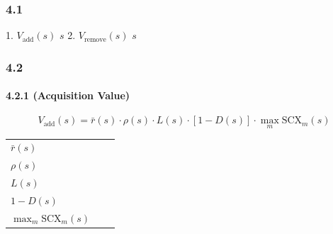 \documentclass[
  12pt,
]{article}
\begin{document}
\subsubsection{4.1 }\label{ux95eeux9898ux8bbeux5b9a-3}

 1. \textbf{}
\(V_{\text{add}}(s)\) \(s\)
 2. \textbf{}
\(V_{\text{remove}}(s)\) \(s\)




\subsubsection{4.2 }\label{ux6570ux5b66ux6a21ux578b-3}

\paragraph{4.2.1  (Acquisition
Value)}\label{ux91c7ux96c6ux4ef7ux503c-acquisition-value}

\textbf{}

\[
V_{\text{add}}(s) = \bar{r}(s) \cdot \rho(s) \cdot L(s) \cdot [1 - D(s)] \cdot \max_m \text{SCX}_m(s)
\]

\textbf{}

\begin{longtable}[]{@{}
  >{\raggedright\arraybackslash}p{}
  >{\raggedright\arraybackslash}p{}
  >{\raggedright\arraybackslash}p{}@{}}
\toprule\noalign{}
\begin{minipage}[b]{\linewidth}\raggedright

\end{minipage} & \begin{minipage}[b]{\linewidth}\raggedright

\end{minipage} & \begin{minipage}[b]{\linewidth}\raggedright

\end{minipage} \\
\midrule\noalign{}
\endhead
\bottomrule\noalign{}
\endlastfoot
\(\bar{r}(s)\) &  &  \\
\(\rho(s)\) &  &  \\
\(L(s)\) &  &  \\
\(1 - D(s)\) &  &  \\
\(\max_m \text{SCX}_m(s)\) &  &
 \\
\end{longtable}
\end{document}
